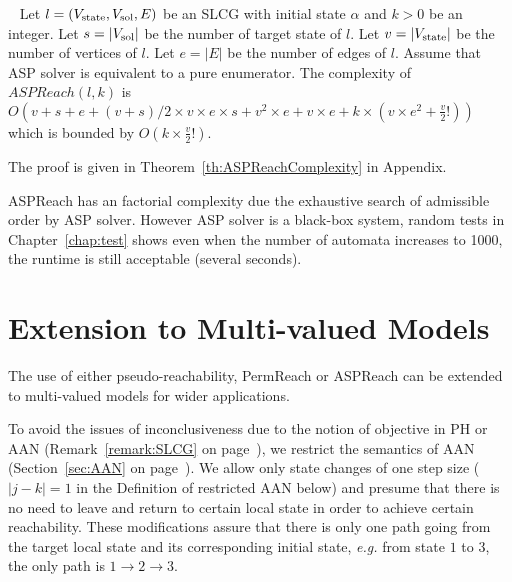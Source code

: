 \begin{theorem} ~
    Let $l=(V_{\mathrm{state}},V_{\mathrm{sol}}, E)$ be an SLCG with initial state $\alpha$ and $k > 0$ be an integer.
    Let $s=|V_{\mathrm{sol}}|$ be the number of target state of $l$.
    Let $v = |V_{\mathrm{state}}|$ be the number of vertices of $l$.
    Let $e=|E|$ be the number of edges of $l$.
    Assume that ASP solver is equivalent to a pure enumerator.
    The complexity of $ASPReach(l,k)$ is $O(v + s + e + (v+s) / 2 \times v \times e \times s + v^{2} \times e + v \times e + k \times (v \times e^{2} + \frac{v}{2}!))$ which is bounded by $O(k \times \frac{v}{2}!)$.
    
    The proof is given in Theorem~\ref{th:ASPReachComplexity} in Appendix.
\end{theorem}

ASPReach has an factorial complexity due the exhaustive search of admissible order by ASP solver.
However ASP solver is a black-box system, random tests in Chapter~\ref{chap:test} shows even when the number of automata increases to 1000, the runtime is still acceptable (several seconds).

\section{Extension to Multi-valued Models}\label{sec:extentionMultiValue}

The use of either pseudo-reachability, PermReach or ASPReach can be extended to multi-valued models for wider applications.

To avoid the issues of inconclusiveness due to the notion of objective in PH or AAN (Remark~\ref{remark:SLCG} on page~\pageref{remark:SLCG}), we restrict the semantics of AAN (Section~\ref{sec:AAN} on page~\pageref{sec:AAN}).
We allow only state changes of one step size ($|j-k|=1$ in the Definition of restricted AAN below) and presume that there is no need to leave and return to certain local state in order to achieve certain reachability.
These modifications assure that there is only one path going from the target local state and its corresponding initial state, \textit{e.g.} from state $1$ to $3$, the only path is $1\to 2\to 3$.

